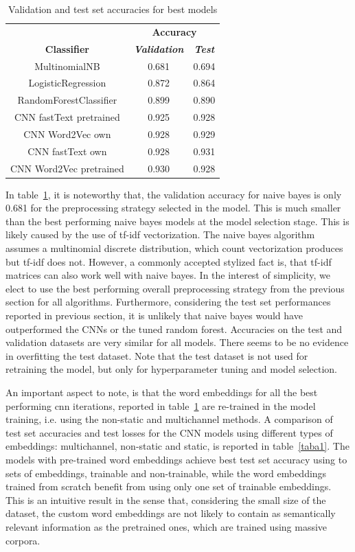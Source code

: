 \documentclass[conference]{IEEEtran}
\begin{document}
\begin{table}[htbp]
\caption{Validation and test set accuracies for best models}
\begin{center}
\begin{tabular}{|c|c|c|}
\hline
\textbf{}&\multicolumn{2}{|c|}{\textbf{Accuracy}} \\ 
\cline{2-3}
\textbf{Classifier} & \textbf{\textit{Validation}}& \textbf{\textit{Test}} \\ 
\hline
MultinomialNB & 0.681 & 0.694 \\ 
\hline
LogisticRegression & 0.872 & 0.864 \\ 
\hline
RandomForestClassifier & 0.899 & 0.890 \\ 
\hline
CNN fastText pretrained & 0.925 & 0.928 \\ 
\hline
CNN Word2Vec own & 0.928 & 0.929 \\ 
\hline
CNN fastText own & 0.928 & 0.931 \\ 
\hline
CNN Word2Vec pretrained & 0.930 & 0.928 \\ 
\hline
\end{tabular}
\label{tab1}
\end{center}
\end{table}

In table~\ref{tab1}, it is noteworthy that, the validation accuracy for naive bayes is only 0.681 for the preprocessing strategy selected in the model. This is much smaller than the best performing naive bayes models at the model selection stage. This is likely caused by the use of tf-idf vectorization. The naive bayes algorithm assumes  a multinomial discrete distribution, which count vectorization produces but tf-idf does not. However, a commonly accepted stylized fact is, that tf-idf matrices can also work well with naive bayes. In the interest of simplicity, we elect to use the best performing overall preprocessing strategy from the previous section for all algorithms. Furthermore, considering the test set performances reported in previous section, it is unlikely that naive bayes would have outperformed the CNNs or the tuned random forest. Accuracies on the test and validation datasets are very similar for all models. There seems to be no evidence in overfitting the test dataset. Note that the test dataset is not used for retraining the model, but only for hyperparameter tuning and model selection.

An important aspect to note, is that the word embeddings for all the best performing cnn iterations, reported in table~\ref{tab1} are re-trained in the model training, i.e. using the non-static and multichannel methods. A comparison of test set accuracies and test losses for the CNN models using different types of embeddings: multichannel, non-static and static, is reported in table~\ref{taba1}. The models with pre-trained word embeddings achieve best test set accuracy using to sets of embeddings, trainable and non-trainable, while the word embeddings trained from scratch benefit from using only one set of trainable embeddings. This is an intuitive result in the sense that, considering the small size of the dataset, the custom word embeddings are not likely to contain as semantically relevant information as the pretrained ones, which are trained using massive corpora.
\end{document}
